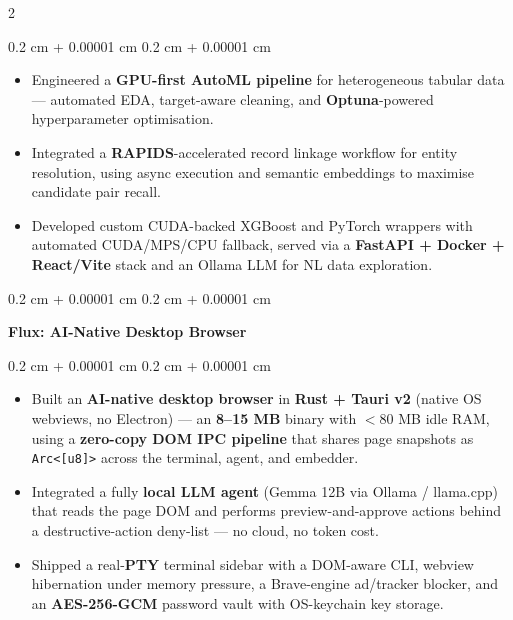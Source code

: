\documentclass[10pt, letterpaper]{article}
\newenvironment{highlights}{
    \begin{itemize}[
        topsep=0.03 cm,
        parsep=0.03 cm,
        partopsep=0pt,
        itemsep=0pt,
        leftmargin=0.4 cm + 10pt
    ]
}{
    \end{itemize}
} %
\newenvironment{onecolentry}{
    \begin{adjustwidth}{
        0.2 cm + 0.00001 cm
    }{
        0.2 cm + 0.00001 cm
    }
}{
    \end{adjustwidth}
} %
\newenvironment{twocolentry}[2][]{
    \onecolentry
    \def\secondColumn{#2}
}{
    \hfill \secondColumn
    \endonecolentry
} %
\let\hrefWithoutArrow\href
\renewcommand{\href}[2]{\hrefWithoutArrow{#1}{\ifthenelse{\equal{#2}{}}{ }{#2 }\raisebox{.15ex}{\footnotesize \faExternalLink*}}}
\begin{document}
\begin{paracol}{2}
    \vspace{0.05 cm}
    \begin{onecolentry}
        \begin{highlights}
            \item Engineered a \textbf{GPU-first AutoML pipeline} for heterogeneous tabular data — automated EDA, target-aware cleaning, and \textbf{Optuna}-powered hyperparameter optimisation.
            \item Integrated a \textbf{RAPIDS}-accelerated record linkage workflow for entity resolution, using async execution and semantic embeddings to maximise candidate pair recall.
            \item Developed custom CUDA-backed XGBoost and PyTorch wrappers with automated CUDA/MPS/CPU fallback, served via a \textbf{FastAPI + Docker + React/Vite} stack and an Ollama LLM for NL data exploration.
        \end{highlights}
    \end{onecolentry}

    \begin{twocolentry}{
        \href{https://github.com/razeenwasif/flux}{Github}
    }
        \textbf{Flux: AI-Native Desktop Browser}
    \end{twocolentry}

    \vspace{0.05 cm}
    \begin{onecolentry}
        \begin{highlights}
            \item Built an \textbf{AI-native desktop browser} in \textbf{Rust + Tauri v2} (native OS webviews, no Electron) — an \textbf{8--15 MB} binary with $<$80 MB idle RAM, using a \textbf{zero-copy DOM IPC pipeline} that shares page snapshots as \texttt{Arc<[u8]>} across the terminal, agent, and embedder.
            \item Integrated a fully \textbf{local LLM agent} (Gemma 12B via Ollama / llama.cpp) that reads the page DOM and performs preview-and-approve actions behind a destructive-action deny-list — no cloud, no token cost.
            \item Shipped a real-\textbf{PTY} terminal sidebar with a DOM-aware CLI, webview hibernation under memory pressure, a Brave-engine ad/tracker blocker, and an \textbf{AES-256-GCM} password vault with OS-keychain key storage.
        \end{highlights}
    \end{onecolentry}


\end{paracol}
\end{document}
